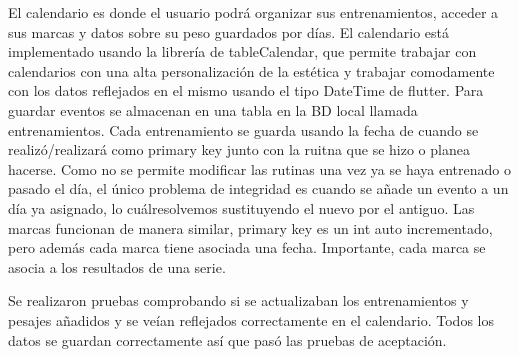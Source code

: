 El calendario es donde el usuario podrá organizar sus entrenamientos, acceder a sus marcas y datos sobre su peso guardados por días. El calendario está implementado usando la librería de tableCalendar, que permite trabajar con calendarios con una alta personalización de la estética y trabajar comodamente con los datos reflejados en el mismo usando el tipo DateTime de flutter. Para guardar eventos se almacenan en una tabla en la BD local llamada entrenamientos. Cada entrenamiento se guarda usando la fecha de cuando se realizó/realizará como primary key junto con la ruitna que se hizo o planea hacerse. Como no se permite modificar las rutinas una vez ya se haya entrenado o pasado el día, el único problema de integridad es cuando se añade un evento a un día ya asignado, lo cuálresolvemos sustituyendo el nuevo por el antiguo. Las marcas funcionan de manera similar, primary key es un int auto incrementado, pero además cada marca tiene asociada una fecha. Importante, cada marca se asocia a los resultados de una serie.

Se realizaron pruebas comprobando si se actualizaban los entrenamientos y pesajes añadidos y se veían reflejados correctamente en el calendario. Todos los datos se guardan correctamente así que pasó las pruebas de aceptación.


